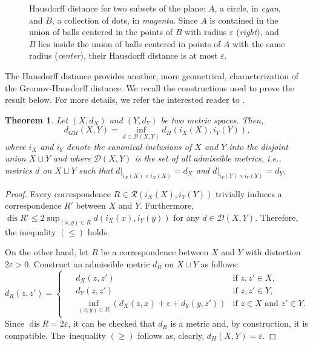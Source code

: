 \documentclass[8pt,a4paper,oneside,english,english]{article}
\theoremstyle{plain}
\theoremstyle
{plain}
\newtheorem{theorem}{Theorem}[section]
\theoremstyle{definition}
\newcommand{\GH}{d_{GH}}
\DeclareMathOperator{\dis}{dis}
\begin{document}
\begin{figure}[h!]
\begin{subfigure}{0.25\textwidth}
	\end{subfigure}
	\caption{\footnotesize Hausdorff distance for two subsets of the plane: $A$, a circle, in \textit{cyan}, and $B$, a collection of dots, in \textit{magenta}. Since $A$ is contained in the union of balls centered in the points of $B$ with radius $\varepsilon$ (\textit{right}), and $B$ lies inside the union of balls centered in points of $A$ with the same radius (\textit{center}), their Hausdorff distance is at most $\varepsilon$.}\label{fig:Hausdorff}
\end{figure}

The Hausdorff distance provides another, more geometrical, characterization of the Gromov-Hausdorff distance. We recall the constructions used to prove the result below. For more details, we refer the interested reader to \cite{KalOst,ChoMem3}.
\begin{theorem}\label{thm:GH_via_embed}
    Let $(X,d_X)$ and $(Y,d_Y)$ be two metric spaces. Then, 
    \[
    \GH(X,Y)=\inf_{d\in\mathcal D(X,Y)}d_H(i_X(X),i_Y(Y)),
    \]
    where $i_X$ and $i_Y$ denote the canonical inclusions of $X$ and $Y$ into the disjoint union $X\sqcup Y$ and where $\mathcal D(X,Y)$ is the set of all {\em admissible metrics}, i.e., metrics $d$ on $X\sqcup Y$ such that $d|_{i_X(X)\times i_X(X)}=d_X$ and $d|_{i_Y(Y)\times i_Y(Y)}=d_Y$.
\end{theorem}
\begin{proof}
    Every correspondence $R\in\mathcal R(i_X(X),i_Y(Y))$ trivially induces a correspondence $R'$ between $X$ and $Y$. Furthermore, $\dis R'\leq 2\sup_{(x,y)\in R}d(i_X(x),i_Y(y))$ for any $d \in \mathcal D(X,Y)$. Therefore, the inequality $(\leq)$ holds.

    On the other hand, let $R$ be a correspondence between $X$ and $Y$ with distortion $2\varepsilon>0$. Construct an admissible metric $d_R$ on $X\sqcup Y$ as follows:
    \[
    d_R(z,z')=\begin{cases}
        \begin{aligned}
            &d_X(z,z') &\text{if $z,z'\in X$,}\\
            &d_Y(z,z') &\text{if $z,z'\in Y$,}\\
            &\inf_{(x,y)\in R}(d_X(z,x)+\varepsilon+d_Y(y,z')) &\text{if $z\in X$ and $z'\in Y$.}
        \end{aligned}
    \end{cases}
    \]
    Since $\dis R=2\varepsilon$, it can be checked that $d_R$ is a metric and, by construction, it is compatible.
    The~inequality $(\geq)$ follows as, clearly, $d_H(X,Y) = \varepsilon$.
\end{proof}
\end{document}
